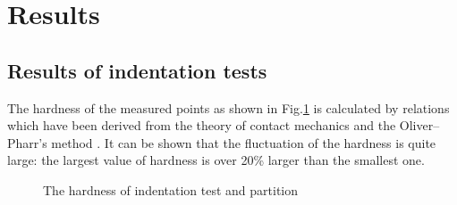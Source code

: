 \documentclass[review]{elsarticle}
\begin{document}
\section{Results}

\subsection{Results of indentation tests}

The hardness of the measured points as shown in Fig.\ref{fig:hardness} is calculated by relations which have been derived from the theory of contact mechanics and the Oliver–Pharr’s method \cite{oliver1992improved}. It can be shown that the fluctuation of the hardness is quite large: the largest value of hardness is over 20\% larger than the smallest one.

\begin{figure}[h!]
\centering


\caption{The hardness of indentation test and partition}
\label{fig:hardness}
\end{figure}
\end{document}
